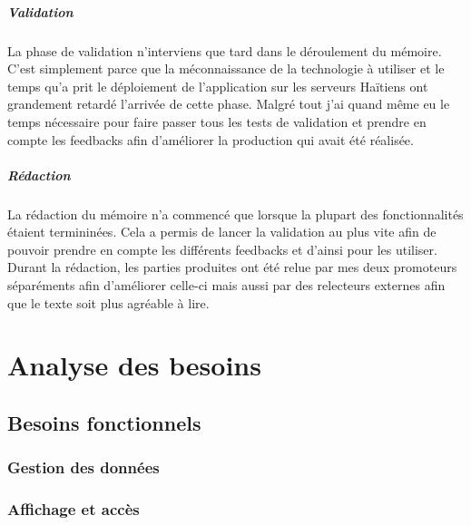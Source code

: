 \documentclass{EPL-master-thesis-covers-FR}
\begin{document}
			\paragraph*{Validation}
			La phase de validation n'interviens que tard dans le déroulement du mémoire. C'est simplement parce que la méconnaissance de la technologie à utiliser et le temps qu'a prit le déploiement de l'application sur les serveurs Haïtiens ont grandement retardé l'arrivée de cette phase. Malgré tout j'ai quand même eu le temps nécessaire pour faire passer tous les tests de validation et prendre en compte les feedbacks afin d'améliorer la production qui avait été réalisée.			
			
			
			\paragraph*{Rédaction}
			La rédaction du mémoire n'a commencé que lorsque la plupart des fonctionnalités étaient termininées. Cela a permis de lancer la validation au plus vite afin de pouvoir prendre en compte les différents feedbacks et d'ainsi pour les utiliser.
			Durant la rédaction, les parties produites ont été relue par mes deux promoteurs séparéments afin d'améliorer celle-ci mais aussi par des relecteurs externes afin que le texte soit plus agréable à lire. 
			
			

	\chapter{Analyse des besoins}
		\label{sec:analyse_besoins}


		\section{Besoins fonctionnels}

			

			\subsection*{Gestion des données}
				\label{sec:gest_donnee}



			\subsection*{Affichage et accès}
\end{document}
